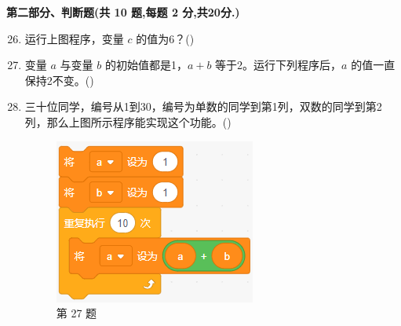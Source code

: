 \documentclass[10pt, a4paper]{article}
\newcommand{\hq}{\hfill(\qquad)}
\begin{document}
    {\noindent\textbf{第二部分、判断题(共 10 题,每题 2 分,共20分.)}}
    \begin{enumerate}
        \setcounter{enumi}{25}
        \item 运行上图程序，变量 $c$ 的值为6？\hq

        \item 变量 $a$ 与变量 $b$ 的初始值都是1，$a+b$ 等于2。运行下列程序后，$a$ 的值一直保持2不变。\hq

        \item 三十位同学，编号从1到30，编号为单数的同学到第1列，双数的同学到第2列，那么上图所示程序能实现这个功能。\hq
        
        \begin{figure}[htbp]
            \centering
            \begin{minipage}[t]{.23\textwidth}
                \centering
                \includegraphics[width=\textwidth]{figure/27.png}
                \caption*{第 27 题}
            \end{minipage}
            \begin{minipage}[t]{.2\textwidth}
                \centering

\end{minipage}
\end{figure}
\end{enumerate}
\end{document}
